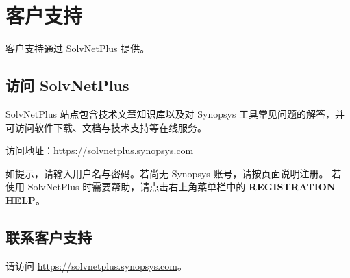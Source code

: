 \section*{客户支持}

客户支持通过 SolvNetPlus 提供。

\subsection*{访问 SolvNetPlus}

SolvNetPlus 站点包含技术文章知识库以及对 Synopsys 工具常见问题的解答，并可访问软件下载、文档与技术支持等在线服务。

访问地址：\url{https://solvnetplus.synopsys.com}

如提示，请输入用户名与密码。若尚无 Synopsys 账号，请按页面说明注册。
若使用 SolvNetPlus 时需要帮助，请点击右上角菜单栏中的 \textbf{REGISTRATION HELP}。

\subsection*{联系客户支持}

请访问 \url{https://solvnetplus.synopsys.com}。
